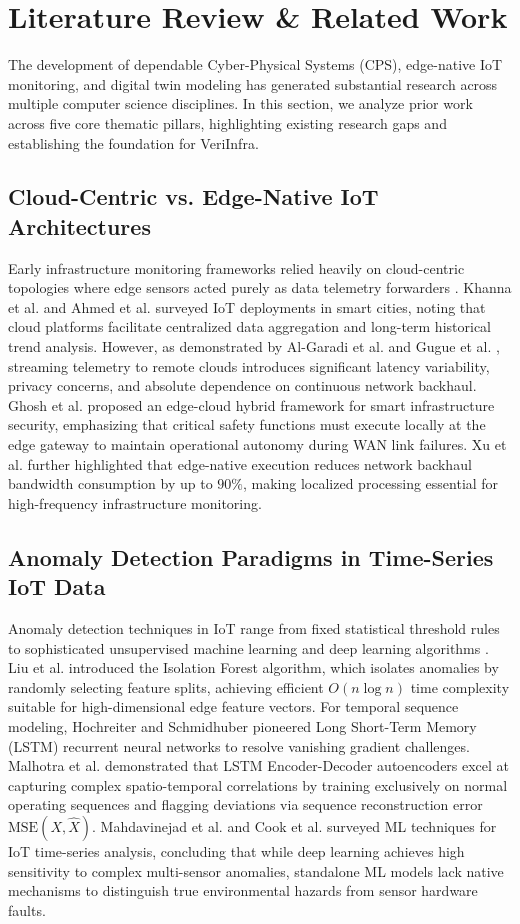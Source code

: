 \documentclass[conference]{IEEEtran}
\begin{document}
\section{Literature Review \& Related Work}
\label{sec:lit_review}
The development of dependable Cyber-Physical Systems (CPS), edge-native IoT monitoring, and digital twin modeling has generated substantial research across multiple computer science disciplines. In this section, we analyze prior work across five core thematic pillars, highlighting existing research gaps and establishing the foundation for VeriInfra.

\subsection{Cloud-Centric vs. Edge-Native IoT Architectures}
Early infrastructure monitoring frameworks relied heavily on cloud-centric topologies where edge sensors acted purely as data telemetry forwarders \cite{b7, b10}. Khanna et al. \cite{b9} and Ahmed et al. \cite{b7} surveyed IoT deployments in smart cities, noting that cloud platforms facilitate centralized data aggregation and long-term historical trend analysis. However, as demonstrated by Al-Garadi et al. \cite{b6} and Gugue et al. \cite{b8}, streaming telemetry to remote clouds introduces significant latency variability, privacy concerns, and absolute dependence on continuous network backhaul. Ghosh et al. \cite{b10} proposed an edge-cloud hybrid framework for smart infrastructure security, emphasizing that critical safety functions must execute locally at the edge gateway to maintain operational autonomy during WAN link failures. Xu et al. \cite{b18} further highlighted that edge-native execution reduces network backhaul bandwidth consumption by up to $90\%$, making localized processing essential for high-frequency infrastructure monitoring.

\subsection{Anomaly Detection Paradigms in Time-Series IoT Data}
Anomaly detection techniques in IoT range from fixed statistical threshold rules to sophisticated unsupervised machine learning and deep learning algorithms \cite{b13, b14, b20}. Liu et al. \cite{b1} introduced the Isolation Forest algorithm, which isolates anomalies by randomly selecting feature splits, achieving efficient $O(n \log n)$ time complexity suitable for high-dimensional edge feature vectors. For temporal sequence modeling, Hochreiter and Schmidhuber \cite{b4} pioneered Long Short-Term Memory (LSTM) recurrent neural networks to resolve vanishing gradient challenges. Malhotra et al. \cite{b5} demonstrated that LSTM Encoder-Decoder autoencoders excel at capturing complex spatio-temporal correlations by training exclusively on normal operating sequences and flagging deviations via sequence reconstruction error $\text{MSE}(X, \hat{X})$. Mahdavinejad et al. \cite{b13} and Cook et al. \cite{b14} surveyed ML techniques for IoT time-series analysis, concluding that while deep learning achieves high sensitivity to complex multi-sensor anomalies, standalone ML models lack native mechanisms to distinguish true environmental hazards from sensor hardware faults.
\end{document}
